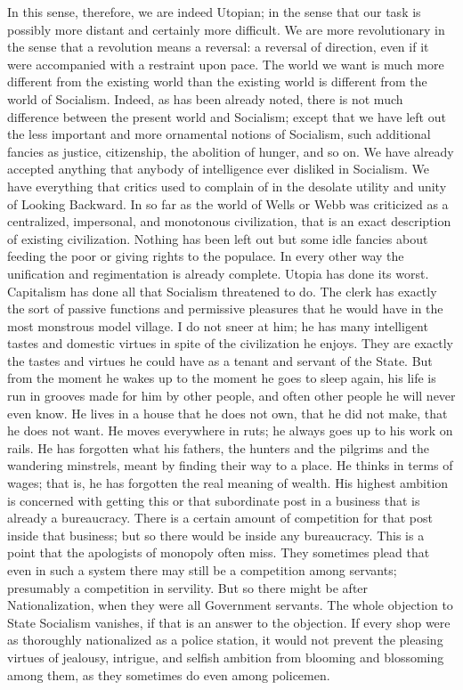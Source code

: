 \documentclass{book}
\begin{document}
In this sense, therefore, we are indeed Utopian; in the sense that our task is possibly more distant and certainly more difficult. We are more revolutionary in the sense that a revolution means a reversal: a reversal of direction, even if it were accompanied with a restraint upon pace. The world we want is much more different from the existing world than the existing world is different from the world of Socialism. Indeed, as has been already noted, there is not much difference between the present world and Socialism; except that we have left out the less important and more ornamental notions of Socialism, such additional fancies as justice, citizenship, the abolition of hunger, and so on. We have already accepted anything that anybody of intelligence ever disliked in Socialism. We have everything that critics used to complain of in the desolate utility and unity of Looking Backward. In so far as the world of Wells or Webb was criticized as a centralized, impersonal, and monotonous civilization, that is an exact description of existing civilization. Nothing has been left out but some idle fancies about feeding the poor or giving rights to the populace. In every other way the unification and regimentation is already complete. Utopia has done its worst. Capitalism has done all that Socialism threatened to do. The clerk has exactly the sort of passive functions and permissive pleasures that he would have in the most monstrous model village. I do not sneer at him; he has many intelligent tastes and domestic virtues in spite of the civilization he enjoys. They are exactly the tastes and virtues he could have as a tenant and servant of the State. But from the moment he wakes up to the moment he goes to sleep again, his life is run in grooves made for him by other people, and often other people he will never even know. He lives in a house that he does not own, that he did not make, that he does not want. He moves everywhere in ruts; he always goes up to his work on rails. He has forgotten what his fathers, the hunters and the pilgrims and the wandering minstrels, meant by finding their way to a place. He thinks in terms of wages; that is, he has forgotten the real meaning of wealth. His highest ambition is concerned with getting this or that subordinate post in a business that is already a bureaucracy. There is a certain amount of competition for that post inside that business; but so there would be inside any bureaucracy. This is a point that the apologists of monopoly often miss. They sometimes plead that even in such a system there may still be a competition among servants; presumably a competition in servility. But so there might be after Nationalization, when they were all Government servants. The whole objection to State Socialism vanishes, if that is an answer to the objection. If every shop were as thoroughly nationalized as a police station, it would not prevent the pleasing virtues of jealousy, intrigue, and selfish ambition from blooming and blossoming among them, as they sometimes do even among policemen.
\end{document}
